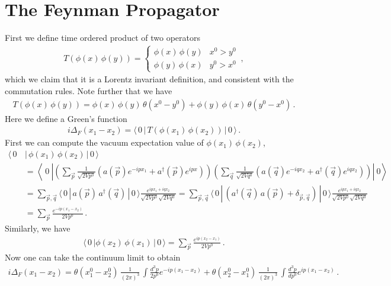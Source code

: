\documentclass[11pt, onesided]{book}
\theoremstyle{break}
\theoremstyle{break}
\begin{document}
\section[The Feynman Propagator]{\color{red}The Feynman Propagator\color{black}}
First we define time ordered product of two operators
\begin{align*}
T(\phi(x)\, \phi(y)) = \begin{cases}
\phi(x) \,\phi(y) & x^0>y^0\\
\phi(y) \,\phi(x) & y^0>x^0
\end{cases}\,,
\end{align*}
which we claim that it is a Lorentz invariant definition, and consistent with the commutation rules. Note further that we have
\begin{align*}
T(\phi(x)\,\phi(y)) = \phi(x) \,\phi(y)\, \theta(x^0 - y^0) + \phi(y)\, \phi(x) \,\theta(y^0 - x^0)\,.
\end{align*}
Here we define a Green's function
\begin{align*}
i\Delta_F(x_1 - x_2) = \langle\, 0\, |\, T(\phi(x_1)\,\phi(x_2))\,|\,0\,\rangle\,.
\end{align*}
First we can compute the vacuum expectation value of $\phi(x_1)\,\phi(x_2)$, 
\begin{align*}
\langle\, 0\, &|\,\phi(x_1)\,\phi(x_2)\, |\,0\,\rangle  \\
&=\left\langle\ 0\ \left| \left(\sum_{\vec{p}}\frac{1}{\sqrt{2Vp^0}} \left( a(\vec{p}) e^{-ipx_1} + a^\dagger(\vec{p}) e^{ipx}\right)\right)\left( \sum_{\vec{q}}\frac{1}{\sqrt{2Vq^0}}\left( a(\vec{q})e^{-iqx_2} + a^\dagger(\vec{q}) e^{iqx_2}\right) \right)\right|\ 0 \right\rangle\\
&= \sum_{\vec{p},\vec{q}}\langle \, 0 \, |\, a(\vec{p})\, a^\dagger(\vec{q})\, |\, 0 \, \rangle \frac{e^{ipx_1 + iqx_2}}{\sqrt{2Vp^0 }\sqrt{2Vq^0}}  = \sum_{\vec{p},\vec{q}}\langle \, 0 \, |\, (a^\dagger(\vec{q})\, a(\vec{p}) + \delta_{\vec{p},\vec{q}})\, |\, 0 \, \rangle \frac{e^{ipx_1 + iqx_2}}{\sqrt{2Vp^0 }\sqrt{2Vq^0}}\\
&=\sum_{\vec{p}} \frac{e^{-ip(x_1 - x_2)}}{2Vp^0} \,.
\end{align*}
Similarly, we have
\begin{align*}
\langle\, 0\, |\phi(x_2)\,\phi(x_1)\, |\,0\,\rangle = \sum_{\vec{p}} \frac{e^{ip(x_2 -x_1)}}{2Vp^0}\,.
\end{align*}
Now one can take the continuum limit to obtain
\begin{align*}
i\Delta_F(x_1 - x_2) = \theta(x_1^0 - x_2^0) \,\frac{1}{(2\pi)^3}\,\int \frac{d^3p}{2p^0} e^{-ip(x_1-x_2)} + \theta(x_2^0 - x_1^0)\, \frac{1}{(2\pi)^3}\,\int \frac{d^3p}{dp^0}e^{ip(x_1 - x_2)}\,.
\end{align*}
\end{document}
